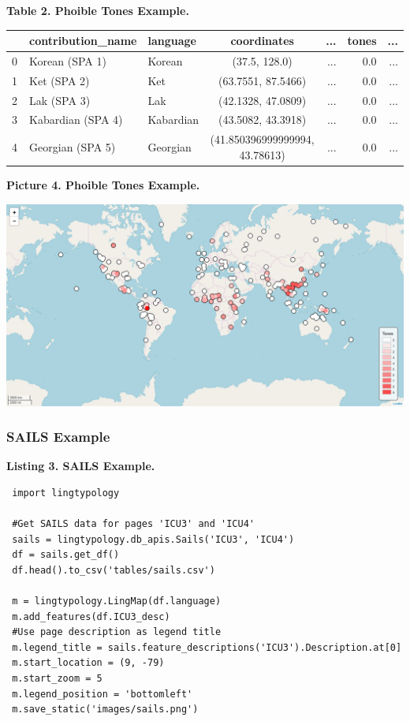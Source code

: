 \documentclass[a4paper,12pt]{article}
\begin{document}
\textbf{Table 2. Phoible Tones Example.}

\begin{adjustbox}{max width=\textwidth}
\begin{tabular}{ l | l | l | c | r | r | r }
    ~ & contribution\_name & language & coordinates & ... & tones & ... \\
    \hline
    0 & Korean (SPA 1) & Korean & (37.5, 128.0) & ... & 0.0 & ... \\
    1 & Ket (SPA 2) & Ket & (63.7551, 87.5466) & ... & 0.0 & ... \\
    2 & Lak (SPA 3) & Lak & (42.1328, 47.0809) & ... & 0.0 & ... \\
    3 & Kabardian (SPA 4) & Kabardian & (43.5082, 43.3918) & ... & 0.0 & ... \\
    4 & Georgian (SPA 5) & Georgian & (41.850396999999994, 43.78613) & ... & 0.0 & ... \\
\end{tabular}
\end{adjustbox}

\bigskip

\begin{samepage}
\textbf{Picture 4. Phoible Tones Example.}\nopagebreak

\includegraphics[width=\textwidth]{images/phoible.png}
\end{samepage}

\subsubsection{SAILS Example}

\textbf{Listing 3. SAILS Example.}
\begin{lstlisting}
 import lingtypology
 
 #Get SAILS data for pages 'ICU3' and 'ICU4'
 sails = lingtypology.db_apis.Sails('ICU3', 'ICU4')
 df = sails.get_df()
 df.head().to_csv('tables/sails.csv')
 
 m = lingtypology.LingMap(df.language)
 m.add_features(df.ICU3_desc)
 #Use page description as legend title
 m.legend_title = sails.feature_descriptions('ICU3').Description.at[0]
 m.start_location = (9, -79)
 m.start_zoom = 5
 m.legend_position = 'bottomleft'
 m.save_static('images/sails.png')
\end{lstlisting}
\end{document}
